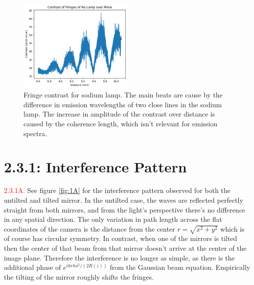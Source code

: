 \documentclass[letterpaper, reqno,11pt]{article}
\begin{document}
\begin{figure}[htpb]
    \centering
    \includegraphics[width=0.5\textwidth]{5B}
    \caption{Fringe contrast for sodium lamp. The main beats are cause by the difference in emission wavelengths of two close lines in the sodium lamp. The increase in amplitude of the contrast over distance is caused by the coherence length, which isn't relevant for emission spectra.}
    \label{fig:rn}
\end{figure}

\newpage

\section{2.3.1: Interference Pattern}

\noindent \textcolor{red}{2.3.1A.} See figure \ref{fig:1A} for the interference pattern observed for both the untilted and tilted mirror. In the untilted case, the waves are reflected perfectly straight from both mirrors, and from the light's perspective there's no difference in any spatial direction. The only variation in path length across the flat coordinates of the camera is the distance from the center $r=\sqrt{x^2+y^2}$ which is of course has circular symmetry. In contrast, when one of the mirrors is tilted then the center of that beam from that mirror doesn't arrive at the center of the image plane. Therefore the interference is no longer as simple, as there is the additional phase of $e^{ik rho^2 /(2R(z))}$ from the Gaussian beam equation. Empirically the tilting of the mirror roughly shifts the fringes.
\end{document}
